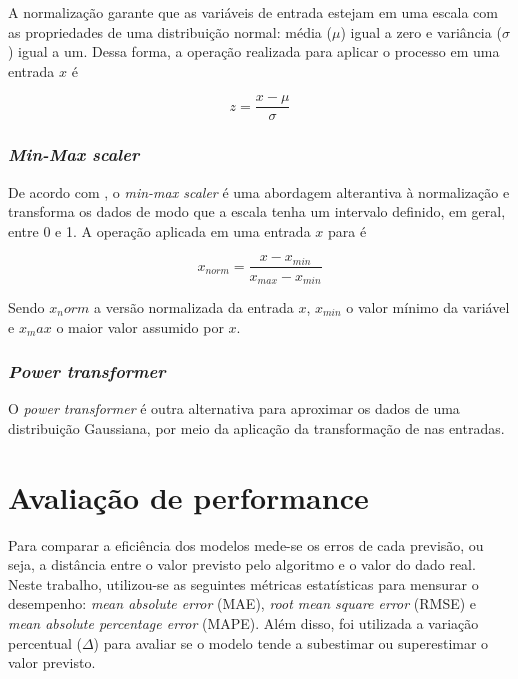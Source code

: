 A normalização garante que as variáveis de entrada estejam em uma 
escala com as propriedades de uma distribuição normal: média ($\mu$)
igual a zero e variância ($\sigma$) igual a um. Dessa forma, a operação 
realizada para aplicar o processo em uma entrada $x$ é

\begin{equation}
  z = \frac{x - \mu}{\sigma}
\end{equation}

\subsubsection{\textit{Min-Max scaler}}

De acordo com \citet{Raschka}, o \textit{min-max scaler} é uma 
abordagem alterantiva à normalização 
e transforma os dados de modo que a 
escala tenha um intervalo definido, em geral, entre
0 e 1. A operação aplicada em uma entrada $x$ para é

\begin{equation}
  x_{norm} = \frac{x - x_{min}}{x_{max} - x_{min}}
\end{equation}

Sendo $x_norm$ a versão normalizada da entrada $x$, $x_{min}$ o valor mínimo
da variável e $x_max$ o maior valor assumido por $x$. 

\subsubsection{\textit{Power transformer}}

O \textit{power transformer} é outra alternativa para aproximar os dados 
de uma distribuição Gaussiana, por meio da aplicação da 
transformação de \citet{yeo} nas entradas.



\section{Avaliação de performance}

Para comparar a eficiência dos modelos mede-se os erros de 
cada previsão, ou seja, a distância entre o valor previsto 
pelo algoritmo e o valor do dado real. Neste trabalho, 
utilizou-se as seguintes métricas estatísticas para 
mensurar o desempenho: \textit{mean absolute error} (MAE),
\textit{root mean square  error} (RMSE) e \textit{mean 
absolute percentage error} (MAPE). Além disso, foi utilizada
a variação percentual ($\Delta$) para avaliar se o modelo tende 
a subestimar ou superestimar o valor previsto.

